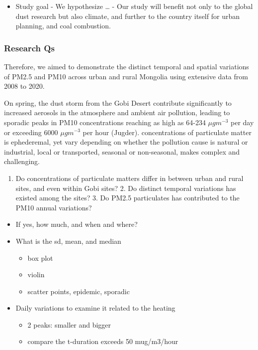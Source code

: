 \documentclass[
  11pt,
]{article}
\providecommand{\tightlist}{%
  \setlength{\itemsep}{0pt}\setlength{\parskip}{0pt}}
\begin{document}
\begin{itemize}
\tightlist
\item
  Study goal - We hypothesize \ldots{} - Our study will benefit not only
  to the global dust research but also climate, and further to the
  country itself for urban planning, and coal combustion.
\end{itemize}

\subsubsection{Research Qs}\label{research-qs}

Therefore, we aimed to demonstrate the distinct temporal and spatial
variations of PM2.5 and PM10 across urban and rural Mongolia using
extensive data from 2008 to 2020.

On spring, the dust storm from the Gobi Desert contribute significantly
to increased aerosols in the atmosphere and ambient air pollution,
leading to sporadic peaks in PM10 concentrations reaching as high as
64-234 \(\mu g m^{-3}\) per day or exceeding 6000 \(\mu g m^{-3}\) per
hour (Jugder). concentrations of particulate matter is ephederemal, yet
vary depending on whether the pollution cause is natural or industrial,
local or transported, seasonal or non-seasonal, makes complex and
challenging.

\begin{enumerate}
\def\labelenumi{\arabic{enumi}.}
\tightlist
\item
  Do concentrations of particulate matters differ in between urban and
  rural sites, and even within Gobi sites? 2. Do distinct temporal
  variations has existed among the sites? 3. Do PM2.5 particulates has
  contributed to the PM10 annual variations?
\end{enumerate}

\begin{itemize}
\tightlist
\item
  If yes, how much, and when and where?
\item
  What is the sd, mean, and median

  \begin{itemize}
  \tightlist
  \item
    box plot
  \item
    violin
  \item
    scatter points, epidemic, sporadic
  \end{itemize}
\item
  Daily variations to examine it related to the heating

  \begin{itemize}
  \tightlist
  \item
    2 peaks: smaller and bigger
  \item
    compare the t-duration exceeds 50 mug/m3/hour
  \end{itemize}
\end{itemize}
\end{document}
